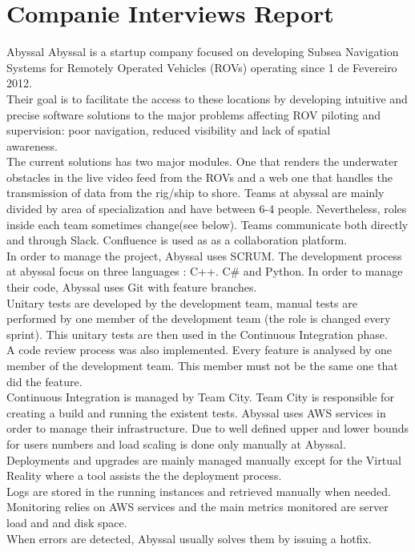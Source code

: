   \section{Companie Interviews Report} \label{anexes:interviews}
    \begin{companyreport}{Abyssal}
        \product
        Abyssal is a startup company focused on developing Subsea Navigation Systems for Remotely Operated Vehicles (ROVs) operating since 1 de Fevereiro 2012.\\
        Their goal is to facilitate the access to these locations by developing intuitive and precise software solutions to the major problems affecting ROV piloting and supervision: poor navigation, reduced visibility and lack of spatial\\ awareness.\\
        The current solutions has two major modules. One that renders the underwater obstacles in the live video feed from the ROVs and a web one that handles the transmission of data from the rig/ship to shore.
        \teams
        Teams at abyssal are mainly divided by area of specialization and have between 6-4 people. Nevertheless, roles inside each team sometimes change(see below). Teams communicate both directly and through Slack. Confluence is used as as a collaboration platform.\\
        In order to manage the project, Abyssal uses SCRUM.
        \development
        The development process at abyssal focus on three languages : C++. C\# and Python. In order to manage their code, Abyssal uses Git with feature branches.\\
        Unitary tests are developed by the development team, manual tests are performed by one member of the development team (the role is changed every sprint). This unitary tests are then used in the Continuous Integration phase.\\
        A code review process was also implemented. Every feature is analysed by one member of the development team. This member must not be the same one that did the feature.\\
        Continuous Integration is managed by Team City. Team City is responsible for creating a build and running the existent tests.
        \operations
        Abyssal uses AWS services in order to manage their infrastructure. Due to well defined upper and lower bounds for users numbers and load scaling is done only manually at Abyssal.\\
        Deployments and upgrades are mainly managed  manually except for the Virtual Reality where a tool assists the the deployment process.\\
        Logs are stored in the running instances and retrieved manually when needed.\\
        Monitoring relies on AWS services and the main metrics monitored are server load and and disk space.\\
        When errors are detected, Abyssal usually solves them by issuing a hotfix.
        \reportend
    \end{companyreport}

